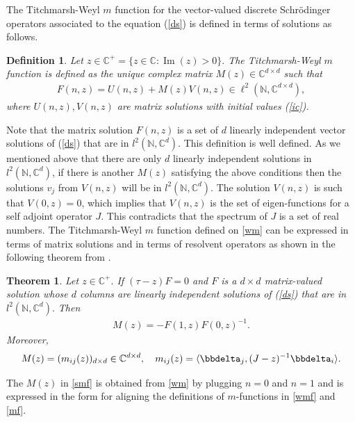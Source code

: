 \documentclass[reqno]{amsart}
\numberwithin{equation}{section}
\newcommand{\C}{\mathbb{C}}
\newcommand{\N}{\mathbb{N}}
\newtheorem{theorem}{Theorem}[section]
\newtheorem{defi}{Definition}[section]
\newcommand{\ip}[2]
      {\ensuremath{\langle #1,#2 \rangle}}
\begin{document}
The Titchmarsh-Weyl $m$ function for the vector-valued discrete Schr\"odinger operators associated to the equation (\ref{ds}) is defined in terms of solutions as follows. 

\begin{defi} Let $z\in \C^+= \{z\in \C : \operatorname{Im}(z) >0\}.$ The Titchmarsh-Weyl $m$ function is defined as the unique complex matrix $ M(z) \in \C^{d\times d}$ such that
\begin{align} \label{wm}
F(n,z) = U(n,z)+ M(z)V(n,z) \in\ell^2(\N, \C^{d\times d} ),
\end{align} where $U(n,z), V(n,z) $ are matrix solutions with initial values (\ref{ic}).\end{defi}

 Note that the matrix  solution $  F(n,z)$ is a set of $d$ linearly independent vector solutions of  (\ref{ds}) that are in $l^2(\N, \C^d).$ This definition is  well defined. As we mentioned above that there are only $d$ linearly independent solutions in $l^2(\N, \C^d)$, if there is another $M(z)$ satisfying the above conditions then the solutions $v_j$ from  $V(n,z)$ will be in $l^2(\N , \C^d)$. The solution   $V(n,z)$ is such that $V(0,z)= 0$, which implies that $V(n,z)$ is the set of eigen-functions for a self adjoint operator $J.$ This contradicts that the spectrum of $J$ is a set of real numbers.
 The Titchmarsh-Weyl $m$ function defined on \eqref{wm} can be expressed in terms of  matrix solutions and in terms of resolvent operators as  shown in the following theorem from \cite{KA2}. 

\begin{theorem}  Let $z\in \C^+.$ If $(\tau-z)F= 0$  and $F $ is a $d\times d$ matrix-valued solution whose $d$ columns are linearly independent solutions of (\ref{ds}) that are in $ l^2(\N, \C^d).$ Then \begin{align} 
\label{smf} M(z)= -F(1,z)F(0,z)^{-1} .
\end{align} Moreover, 
\begin{align} \label
{mf2}M(z) =(m_{ij}(z))_{d\times d} \in \C^{d\times d}, \quad m_{ij}(z) =\ip{\bbdelta_j}{(J-z)^{-1}\bbdelta_i}.
\end{align} 
\end{theorem}

The $ M(z)$ in \eqref{smf} is obtained from \eqref{wm} by plugging $ n =0$ and $ n=1$ and is expressed in the form for aligning the definitions of $m$-functions in \eqref{wmf} and \eqref{mf}.
\end{document}
